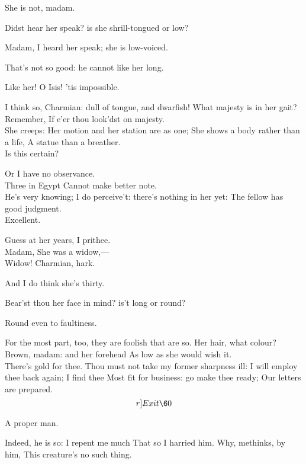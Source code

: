 \documentclass{book}
\begin{document}
	She is not, madam.

\2	Didst hear her speak? is she shrill-tongued or low?

	Madam, I heard her speak; she is low-voiced.

\2	That's not so good: he cannot like her long.

\7	Like her! O Isis! 'tis impossible.

\2	I think so, Charmian: dull of tongue, and dwarfish!
	What majesty is in her gait? Remember,
	If e'er thou look'dst on majesty. \\

	She creeps:
	Her motion and her station are as one;
	She shows a body rather than a life,
	A statue than a breather. \\

\2	Is this certain?

	Or I have no observance. \\

\7	Three in Egypt
	Cannot make better note. \\

\2	He's very knowing;
	I do perceive't: there's nothing in her yet:
	The fellow has good judgment. \\

\7	Excellent.

\2	Guess at her years, I prithee. \\

	Madam,
	She was a widow,--- \\

\2	                  Widow! Charmian, hark.

	And I do think she's thirty.

\2	Bear'st thou her face in mind? is't long or round?

	Round even to faultiness.

\2	For the most part, too, they are foolish that are so.
	Her hair, what colour? \\

	Brown, madam: and her forehead
	As low as she would wish it. \\

\2	There's gold for thee.
	Thou must not take my former sharpness ill:
	I will employ thee back again; I find thee
	Most fit for business: go make thee ready;
	Our letters are prepared. \\	\[r]Exit \60\]

\7	A proper man.

\2	Indeed, he is so: I repent me much
	That so I harried him. Why, methinks, by him,
	This creature's no such thing. \\
\end{document}

